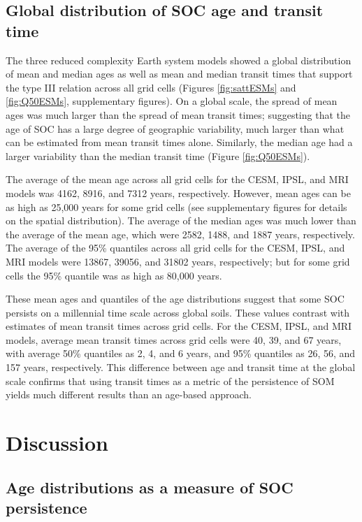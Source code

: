 \documentclass[draft,linenumbers]{agujournal}
\begin{document}
\subsection{Global distribution of SOC age and transit time}
The three reduced complexity Earth system models showed a global distribution of mean and median ages as well as mean and median transit times that support the type III relation across all grid cells (Figures \ref{fig:sattESMs} and \ref{fig:Q50ESMs}, supplementary figures). On a global scale, the spread of mean ages was much larger than the spread of mean transit times; suggesting that the age of SOC has a large degree of geographic variability, much larger than what can be estimated from mean transit times alone. Similarly, the median age had a larger variability than the median transit time (Figure \ref{fig:Q50ESMs}).

The average of the mean age across all grid cells for the CESM, IPSL, and MRI models was 4162, 8916, and 7312 years, respectively. However, mean ages can be as high as 25,000 years for some grid cells (see supplementary figures for details on the spatial distribution). The average of the median ages was much lower than the average of the mean age, which were 2582, 1488, and 1887 years, respectively. 
The average of the 95\% quantiles across all grid cells for the CESM, IPSL, and MRI models were 13867, 39056, and 31802 years, respectively; but for some grid cells the 95\% quantile was as high as 80,000 years. 

These mean ages and quantiles of the age distributions suggest that some SOC persists on a millennial time scale across global soils. These values contrast with estimates of mean transit times across grid cells. For the CESM, IPSL, and MRI models, average mean transit times across grid cells were 40, 39, and 67 years, with average 
50\% quantiles as 2, 4, and 6 years, and 
95\% quantiles as 26,  56, and 157 years, respectively. This difference between age and transit time at the global scale confirms that using transit times as a metric of the persistence of SOM yields much different results than an age-based approach.


\section{Discussion}
\subsection{Age distributions as a measure of SOC persistence}
\end{document}

